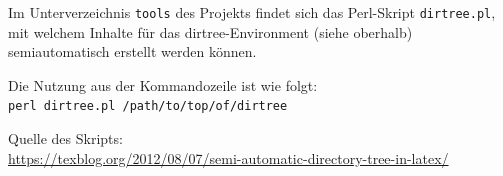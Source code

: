 \small

\begin{minipage}[t]{0.97\linewidth}
\end{minipage}

\vspace{2em}

Im Unterverzeichnis \texttt{tools} des Projekts findet sich das Perl-Skript \texttt{dirtree.pl}, mit welchem Inhalte für das dirtree-Environment (siehe oberhalb) semiautomatisch erstellt werden können.

Die Nutzung aus der Kommandozeile ist wie folgt:\\
\texttt{perl dirtree.pl /path/to/top/of/dirtree}

Quelle des Skripts:\\
\url{https://texblog.org/2012/08/07/semi-automatic-directory-tree-in-latex/}
\normalsize